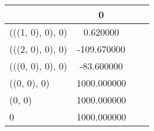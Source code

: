 \begin{tabular}{lccc}
\toprule
 & 0 \\
\midrule
(((1, 0), 0), 0) & 0.620000 \\
(((2, 0), 0), 0) & -109.670000 \\
(((0, 0), 0), 0) & -83.600000 \\
((0, 0), 0) & 1000.000000 \\
(0, 0) & 1000.000000 \\
0 & 1000.000000 \\
\bottomrule
\end{tabular}
